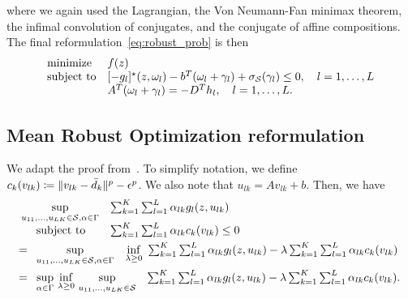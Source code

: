 where we again used the Lagrangian, the Von Neumann-Fan minimax theorem, the infimal convolution of conjugates, and the conjugate of affine compositions. The final reformulation~\eqref{eq:robust_prob} is then
\begin{equation*}
\begin{array}[t]{ll}
	{\text{minimize}} & f(z)\\
	\mbox{subject to} & [-g_l]^\star(z,\omega_l) - b^T(\omega_l + \gamma_l) + \sigma_{\mathcal{S}}(\gamma_l) \leq 0, \quad l = 1,\dots,L\\
	 &A^T(\omega_l+ \gamma_l) = -D^Th_l,\quad l = 1,\dots,L.
\end{array}
\end{equation*}

\subsection{Mean Robust Optimization reformulation}
\label{apx:mroproof}
We adapt the proof from~\cite[Appendix A.3]{mro}. 
To simplify notation, we define $c_k(v_{lk}) \coloneqq   \|v_{lk} - \bar{d}_k \|^p - \epsilon^p$.
We also note that $u_{lk} = Av_{lk}+b$. 
Then, we have
\begin{equation*}
	\begin{aligned}
& \begin{array}[t]{ll}
	\underset{u_{11}, \dots, u_{LK} \in \mathcal{S}, \alpha \in \Gamma}{\sup} &\sum_{k=1}^K \sum_{l=1}^L \alpha_{lk} g_l(z,u_{lk}) \\
	\mbox{~~~~subject to} & \sum_{k=1} ^K \sum_{l=1}^L \alpha_{lk} c_k(v_{lk}) \le 0
\end{array}\\
&=\begin{array}[t]{ll}
	\underset{u_{11}, \dots, u_{LK} \in \mathcal{S}, \alpha \in \Gamma}{\sup} & \underset{\lambda \geq 0}{\inf}~\sum_{k=1}^K \sum_{l=1}^L \alpha_{lk}g_l(z,u_{lk}) - \lambda\sum_{k=1} ^K \sum_{l=1}^L \alpha_{lk} c_k(v_{lk})\\
\end{array}\\
&=\begin{array}[t]{ll}
	\underset{\alpha \in \Gamma}{\sup}~\underset{\lambda \geq 0}{\inf}~\underset{u_{11}, \dots, u_{LK} \in \mathcal{S}}{\sup} &\sum_{k=1}^K \sum_{l=1}^L \alpha_{lk} g_l(z,u_{lk}) - \lambda\sum_{k=1} ^K \sum_{l=1}^L \alpha_{lk} c_k(v_{lk}).\\
\end{array}\\
\end{aligned}
\end{equation*}
